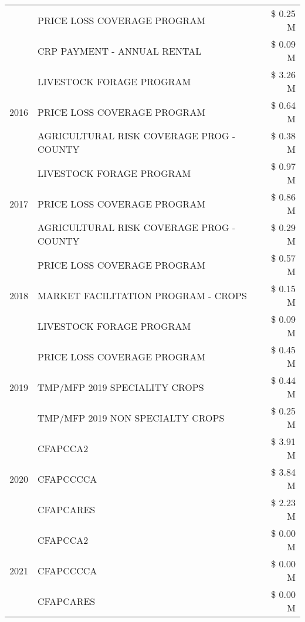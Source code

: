 \begin{tabular}{llr}
 & PRICE LOSS COVERAGE PROGRAM & \$ 0.25 M \\
 & CRP PAYMENT - ANNUAL RENTAL & \$ 0.09 M \\
\cline{1-3}
\multirow[t]{3}{*}{2016} & LIVESTOCK FORAGE PROGRAM & \$ 3.26 M \\
 & PRICE LOSS COVERAGE PROGRAM & \$ 0.64 M \\
 & AGRICULTURAL RISK COVERAGE PROG - COUNTY & \$ 0.38 M \\
\cline{1-3}
\multirow[t]{3}{*}{2017} & LIVESTOCK FORAGE PROGRAM & \$ 0.97 M \\
 & PRICE LOSS COVERAGE PROGRAM & \$ 0.86 M \\
 & AGRICULTURAL RISK COVERAGE PROG - COUNTY & \$ 0.29 M \\
\cline{1-3}
\multirow[t]{3}{*}{2018} & PRICE LOSS COVERAGE PROGRAM & \$ 0.57 M \\
 & MARKET FACILITATION PROGRAM - CROPS & \$ 0.15 M \\
 & LIVESTOCK FORAGE PROGRAM & \$ 0.09 M \\
\cline{1-3}
\multirow[t]{3}{*}{2019} & PRICE LOSS COVERAGE PROGRAM & \$ 0.45 M \\
 & TMP/MFP 2019 SPECIALITY CROPS & \$ 0.44 M \\
 & TMP/MFP 2019 NON SPECIALTY CROPS & \$ 0.25 M \\
\cline{1-3}
\multirow[t]{3}{*}{2020} & CFAPCCA2 & \$ 3.91 M \\
 & CFAPCCCCA & \$ 3.84 M \\
 & CFAPCARES & \$ 2.23 M \\
\cline{1-3}
\multirow[t]{3}{*}{2021} & CFAPCCA2 & \$ 0.00 M \\
 & CFAPCCCCA & \$ 0.00 M \\
 & CFAPCARES & \$ 0.00 M \\
\cline{1-3}
\bottomrule
\end{tabular}
